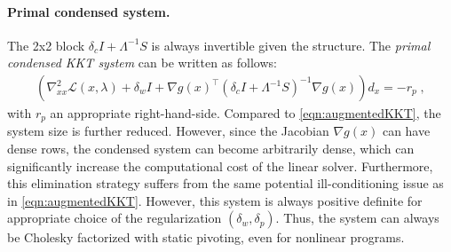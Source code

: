 \documentclass{article}
\begin{document}
\paragraph{Primal condensed system.}
The 2x2 block $ \delta_c I+ \Lambda^{-1}S $ is always invertible given the structure. The
\emph{primal condensed KKT system} can be written as follows:
\begin{align}\label{eqn:kkt_primal}
  \left(\nabla^2_{x x} \mathcal{L}(x, \lambda) + \delta_w I + \nabla g(x)^\top (\delta_c I + \Lambda^{-1} S)^{-1} \nabla g(x)  \right) d_x = - r_p \; ,
\end{align}
with $r_p$ an appropriate right-hand-side.
Compared to \eqref{eqn:augmentedKKT}, the system size is further reduced.
However, since the Jacobian $\nabla g(x)$ can have dense rows, the condensed system can become arbitrarily dense, which can significantly increase the computational cost of the linear solver. Furthermore, this elimination strategy suffers from the same potential ill-conditioning issue as in \eqref{eqn:augmentedKKT}.
However, this system is always positive definite for appropriate choice of the
regularization $(\delta_w, \delta_p)$.
Thus, the system can always be Cholesky factorized with static pivoting, even for nonlinear programs.
\end{document}
